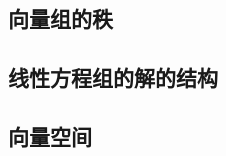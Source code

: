\subsection{向量组的秩}
\paragraph{}

\subsection{线性方程组的解的结构}
\paragraph{}

\subsection{向量空间}
\paragraph{}
